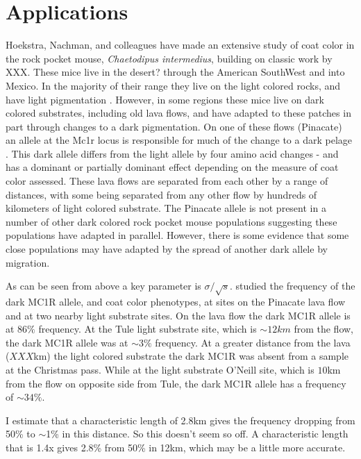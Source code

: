 \documentclass{article}
\begin{document}
\section{Applications} 
Hoekstra, Nachman, and colleagues have made an extensive study of coat color in the rock pocket mouse, \emph{Chaetodipus intermedius}, building on classic work by XXX. These mice live in the desert? through the American SouthWest and into Mexico. In the majority of their range they live on the light colored rocks, and have light pigmentation \citep[presumably an adaptation to visual-based predators][]{}. However, in some regions these mice live on dark colored substrates, including old lava flows, and have adapted to these patches in part through changes to a dark pigmentation. On one of these flows (Pinacate) an allele at the Mc1r locus is responsible for much of the change to a dark pelage \citep{Nachman:03}. This dark allele differs from the light allele by four amino acid changes - and has a dominant or partially dominant effect depending on the measure of coat color assessed. These lava flows are separated from each other by a range of distances, with some being separated from any other flow by hundreds of kilometers of light colored substrate. The Pinacate allele is not present in a number of other dark colored rock pocket mouse populations suggesting these populations have adapted in parallel. However, there is some evidence \citep{Hoekstra:05} that some close populations may have adapted by the spread of another dark allele by migration. 

As can be seen from above a key parameter is $\sigma/\sqrt{s}$. \citep{Hoekstra:04} studied the frequency of the dark MC1R allele, and coat color phenotypes, at sites on the Pinacate lava flow and at two nearby light substrate sites. On the lava flow the dark MC1R allele is at $86\%$ frequency. At the Tule light substrate site, which is $\sim 12km$ from the flow, the dark MC1R allele was at $\sim 3\%$ frequency. At a greater distance from the lava ($XXX$km) the light colored substrate the dark MC1R was absent from a sample at the Christmas pass. While at the light substrate O'Neill site, which is $10$km from the flow on opposite side from Tule, the dark MC1R allele has a frequency of $\sim 34\%$.


I estimate that a characteristic length of 2.8km gives the frequency dropping from 50\% to $\sim$1\% in this distance. So this doesn't seem so off. A characteristic length that is 1.4x gives 2.8\% from 50\% in 12km, which may be a little more accurate.
\end{document}
